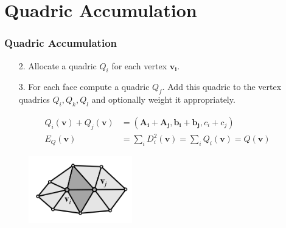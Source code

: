 \documentclass[
	10pt,
	t		%
]{beamer}
\begin{document}
\section{Quadric Accumulation}
\begin{frame}
\frametitle{Quadric Accumulation}
\centering
\begin{enumerate}
\item [2.] Allocate a quadric $Q_i$ for each vertex $\mathbf{v_i}$.
\item [3.] For each face compute a quadric $Q_f$. Add this quadric to the vertex quadrics $Q_i, Q_k, Q_l$ and optionally weight it appropriately.
\end{enumerate}
\begin{align}
Q_i(\mathbf{v}) + Q_j(\mathbf{v}) &= (\mathbf{A_i} + \mathbf{A_j}, \mathbf{b_i} + \mathbf{b_j}, c_i + c_j)\\
E_Q(\mathbf{v}) &= \sum_{i} D_i^2(\mathbf{v}) = \sum_{i} Q_i(\mathbf{v}) = Q(\mathbf{v})
\end{align}
\begin{figure}[ht]
	\centering
    \includegraphics[width=0.4\textwidth]{small_mesh}
\end{figure}
\end{frame}
\end{document}
